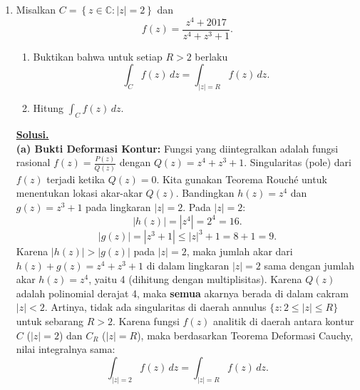 \documentclass[12pt,twoside]{article}
\newenvironment{solution}
{
	\par\noindent\textbf{\underline{Solusi.}}\\
}
{
	\par
}
\begin{document}
\begin{enumerate}
  \item Misalkan $C = \left\lbrace z \in \mathbb{C} : |z|=2 \right\rbrace$ dan
        \begin{equation*}
          f(z) = \dfrac{z^4+2017}{z^4+z^3+1}.
        \end{equation*}
        \begin{enumerate}
          \item Buktikan bahwa untuk setiap $R>2$ berlaku
                \begin{equation*}
                  \displaystyle\int_{C}^{} f(z)\,dz = \displaystyle\int_{|z|=R}^{}f(z)\,dz.
                \end{equation*}
          \item Hitung $\displaystyle\int_{C}^{}f(z)\,dz$.
        \end{enumerate}
        \begin{solution}
          \textbf{(a) Bukti Deformasi Kontur:}
          Fungsi yang diintegralkan adalah fungsi rasional $f(z) = \frac{P(z)}{Q(z)}$ dengan $Q(z) = z^4+z^3+1$.
          Singularitas (pole) dari $f(z)$ terjadi ketika $Q(z)=0$.
          Kita gunakan Teorema Rouché untuk menentukan lokasi akar-akar $Q(z)$.
          Bandingkan $h(z) = z^4$ dan $g(z) = z^3+1$ pada lingkaran $|z|=2$.
          Pada $|z|=2$:
          \[ |h(z)| = |z^4| = 2^4 = 16. \]
          \[ |g(z)| = |z^3+1| \le |z|^3 + 1 = 8 + 1 = 9. \]
          Karena $|h(z)| > |g(z)|$ pada $|z|=2$, maka jumlah akar dari $h(z)+g(z) = z^4+z^3+1$ di dalam lingkaran $|z|=2$ sama dengan jumlah akar $h(z)=z^4$, yaitu 4 (dihitung dengan multiplisitas).
          Karena $Q(z)$ adalah polinomial derajat 4, maka \textbf{semua} akarnya berada di dalam cakram $|z|<2$.
          Artinya, tidak ada singularitas di daerah annulus $\{z : 2 \le |z| \le R\}$ untuk sebarang $R>2$.
          Karena fungsi $f(z)$ analitik di daerah antara kontur $C$ ($|z|=2$) dan $C_R$ ($|z|=R$), maka berdasarkan Teorema Deformasi Cauchy, nilai integralnya sama:
          \[ \int_{|z|=2} f(z)\,dz = \int_{|z|=R} f(z)\,dz. \]


\end{solution}
\end{enumerate}
\end{document}
